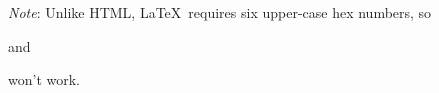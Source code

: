 \noindent \emph{Note}: Unlike HTML, \LaTeX\ requires six upper-case hex numbers, so

\begin{code}
\end{code}

\noindent and

\begin{code}
\end{code}

\noindent won't work.



